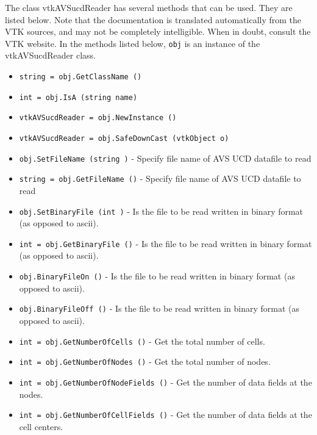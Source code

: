 The class vtkAVSucdReader has several methods that can be used.
  They are listed below.
Note that the documentation is translated automatically from the VTK sources,
and may not be completely intelligible.  When in doubt, consult the VTK website.
In the methods listed below, \verb|obj| is an instance of the vtkAVSucdReader class.
\begin{itemize}
\item  \verb|string = obj.GetClassName ()|

\item  \verb|int = obj.IsA (string name)|

\item  \verb|vtkAVSucdReader = obj.NewInstance ()|

\item  \verb|vtkAVSucdReader = obj.SafeDownCast (vtkObject o)|

\item  \verb|obj.SetFileName (string )| -  Specify file name of AVS UCD datafile to read

\item  \verb|string = obj.GetFileName ()| -  Specify file name of AVS UCD datafile to read

\item  \verb|obj.SetBinaryFile (int )| -  Is the file to be read written in binary format (as opposed to ascii).

\item  \verb|int = obj.GetBinaryFile ()| -  Is the file to be read written in binary format (as opposed to ascii).

\item  \verb|obj.BinaryFileOn ()| -  Is the file to be read written in binary format (as opposed to ascii).

\item  \verb|obj.BinaryFileOff ()| -  Is the file to be read written in binary format (as opposed to ascii).

\item  \verb|int = obj.GetNumberOfCells ()| -  Get the total number of cells.

\item  \verb|int = obj.GetNumberOfNodes ()| -  Get the total number of nodes.

\item  \verb|int = obj.GetNumberOfNodeFields ()| -  Get the number of data fields at the nodes.

\item  \verb|int = obj.GetNumberOfCellFields ()| -  Get the number of data fields at the cell centers.


\end{itemize}

